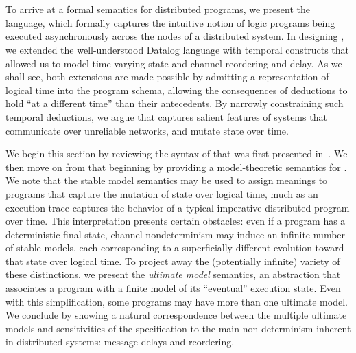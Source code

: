 \section{\large \bf \lang}
\label{sec:foundation}

To arrive at a formal semantics for distributed programs, we present the \lang~\cite{dedalus} language, which formally captures the intuitive notion of logic programs being executed asynchronously across the nodes of a distributed system.
In designing \lang, we extended the well-understood Datalog language with temporal constructs that allowed
us to model time-varying state and channel reordering and delay.  As we shall see, both extensions are made
possible by admitting a representation of logical time into the program schema, allowing the consequences of
deductions to hold ``at a different time'' than their antecedents.  By narrowly constraining such temporal 
deductions, we argue that \lang captures salient features of systems that communicate over unreliable networks, and mutate state over time.

We begin this section by reviewing the syntax of \lang that was first presented in~\cite{dedalus}. We then move on from that beginning by providing a model-theoretic semantics for \lang.  We note that the stable model semantics may be
used to assign meanings to \lang programs that capture the mutation of state over logical time, much as an execution trace  captures the behavior of a
typical imperative distributed program over time.  
This interpretation presents certain obstacles:
even if a \lang program has a deterministic final state, channel nondeterminism may induce an infinite number of stable models, each corresponding to a superficially different evolution toward that state over logical time.  To project away the (potentially infinite) variety of these distinctions, we present the {\em ultimate model} semantics, an abstraction that associates a program with a finite model of 
its ``eventual'' execution state.  Even with this simplification, some programs may have more than one ultimate model.  We conclude by showing a natural correspondence between the multiple ultimate models and sensitivities of the specification to the main non-determinism inherent in distributed systems: message delays and reordering.  


